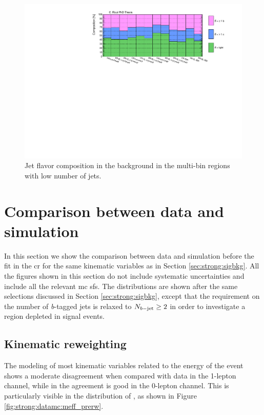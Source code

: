 \begin{figure}[htbp]
\includegraphics[width=\textwidth]{figures/Chap8/Rizzi-Fig8-28.pdf}
\caption{Jet flavor composition in the \ttbar background in the multi-bin regions with low number of jets.}
	\label{fig:HFcomp_Lnj}
\end{figure}

\FloatBarrier

%
\section{Comparison between data and simulation}
\label{sec:strong:dataMC}
In this section we show the comparison between data and simulation before the fit in the \gls{cr}
for the same kinematic variables as in Section \ref{sec:strong:sigbkg}. 
All the figures shown in this section do not include systematic uncertainties and include all the relevant \gls{mc} \glspl{sf}. 
The distributions are shown after the same selections discussed in Section \ref{sec:strong:sigbkg}, 
except that the requirement on the number
of \textit{b}-tagged jets is relaxed to $N_{b\mathrm{-jet}} \geq 2$ 
in order to investigate a region depleted in signal events. 

\subsection{Kinematic reweighting}
\label{sec:strong:kinrw}

The modeling of most kinematic variables related to the energy of the event shows a moderate disagreement 
when compared with data in the 1-lepton channel, while in the agreement is good in the 0-lepton channel. 
This is particularly visible in the distribution of \meff, as shown in Figure \ref{fig:strong:datamc:meff_prerw}.

